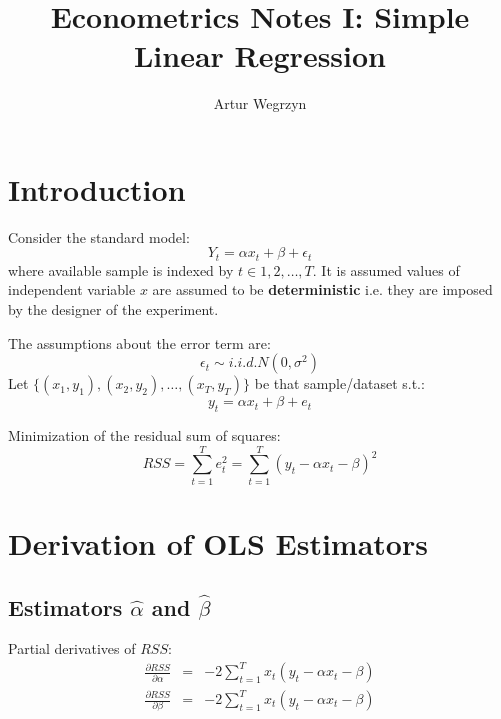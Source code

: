 \documentclass[12pt]{article}
\begin{document}
\title{Econometrics Notes I: Simple Linear Regression}
\author{Artur Wegrzyn}
\maketitle


\tableofcontents


\section{Introduction}

Consider the standard model:
\begin{equation}
Y_t = \alpha x_t + \beta +\epsilon_t
\end{equation}
where available sample is indexed by $t \in {1, 2, \dots, T}$. It is assumed values of independent variable $x$ are assumed to be \textbf{deterministic} i.e. they are imposed by the designer of the experiment.

The assumptions about the error term are:
\begin{equation}
\epsilon_t \sim i.i.d. N(0, \sigma^2)
\end{equation}
Let $\{(x_1, y_1), (x_2, y_2), \dots, (x_T, y_T)\}$ be that sample/dataset s.t.:
\begin{equation}
y_t = \alpha x_t + \beta + e_t
\end{equation}

Minimization of the residual sum of squares:
\begin{equation}
RSS = \sum_{t=1}^{T} e_t^2 = \sum_{t=1}^{T}(y_t - \alpha x_t - \beta)^2
\end{equation}

\section{Derivation of OLS Estimators}

\subsection{Estimators $\hat{\alpha}$ and $\hat{\beta}$}
Partial derivatives of $RSS$:
\begin{eqnarray}
\frac{\partial RSS}{\partial \alpha} &=& -2 \sum_{t=1}^{T}x_t (y_t - \alpha x_t - \beta) \\
\frac{\partial RSS}{\partial \beta} &=& -2 \sum_{t=1}^{T}x_t (y_t - \alpha x_t - \beta)
\end{eqnarray}
\end{document}

